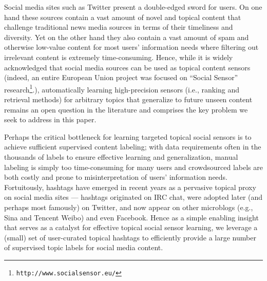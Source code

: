 
\label{sec:introduction}

Social media sites such as Twitter present a double-edged sword for
users.  On one hand these sources contain a vast amount of novel and
topical content that challenge traditional news media sources in terms
of their timeliness and diversity.  Yet on the other hand they also
contain a vast amount of spam and otherwise low-value content for most
users' information needs where filtering out irrelevant content is
extremely time-consuming.  Hence, while it is widely acknowledged that
social media sources can be used as topical content sensors (indeed,
an entire European Union project was focused on ``Social Sensor''
research\footnote{\texttt{http://www.socialsensor.eu/}}.),
automatically learning high-precision sensors (i.e., ranking and
retrieval methods) for arbitrary topics that generalize to future
unseen content remains an open question in the literature and
comprises the key problem we seek to address in this paper.

Perhaps the critical bottleneck for learning targeted topical social
sensors is to achieve sufficient supervised content labeling; with
data requirements often in the thousands of labels to ensure effective
learning and generalization, manual labeling is simply too
time-consuming for many users and crowdsourced labels are both costly
and prone to misinterpretation of users' information needs.
Fortuitously, hashtags have emerged in recent years as a pervasive
topical proxy on social media sites --- hashtags originated on IRC
chat, were adopted later (and perhaps most famously) on Twitter, and
now appear on other microblogs (e.g., Sina and Tencent Weibo) and even
Facebook.  Hence as a simple enabling insight that serves as a
catalyst for effective topical social sensor learning, we leverage a
(small) set of user-curated topical hashtags to efficiently provide a
large number of supervised topic labels for social media content.

